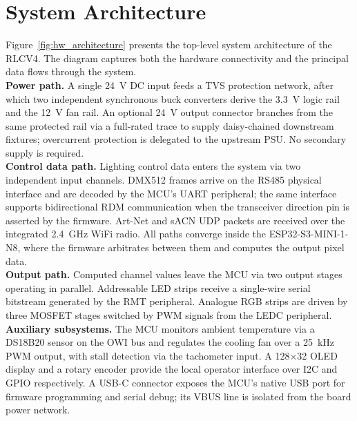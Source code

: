 \section{System Architecture}
\label{sec:system_architecture}

Figure~\ref{fig:hw_architecture} presents the top-level system architecture of the RLCV4.
The diagram captures both the hardware connectivity and the principal data flows through the system. \\

\textbf{Power path.}
A single \SI{24}{\volt} \ac{DC} input feeds a \ac{TVS} protection network, after which two independent synchronous buck converters derive the \SI{3.3}{\volt} logic rail and the \SI{12}{\volt} fan rail.
An optional \SI{24}{\volt} output connector branches from the same protected rail via a full-rated trace to supply daisy-chained downstream fixtures; overcurrent protection is delegated to the upstream \ac{PSU}.
No secondary supply is required. \\

\textbf{Control data path.}
Lighting control data enters the system via two independent input channels.
\ac{DMX}512 frames arrive on the \ac{RS485} physical interface and are decoded by the \ac{MCU}'s \ac{UART} peripheral; the same interface supports bidirectional \ac{RDM} communication when the transceiver direction pin is asserted by the firmware.
Art-Net and \ac{sACN} \ac{UDP} packets are received over the integrated \SI{2.4}{\giga\hertz} \ac{WiFi} radio.
All paths converge inside the ESP32-S3-MINI-1-N8, where the firmware arbitrates between them and computes the output pixel data.\\

\textbf{Output path.}
Computed channel values leave the \ac{MCU} via two output stages operating in parallel.
Addressable \ac{LED} strips receive a single-wire serial bitstream generated by the \ac{RMT} peripheral.
Analogue \ac{RGB} strips are driven by three \ac{MOSFET} stages switched by \ac{PWM} signals from the LEDC peripheral.\\

\textbf{Auxiliary subsystems.}
The \ac{MCU} monitors ambient temperature via a DS18B20 sensor on the \ac{OWI} bus and regulates the cooling fan over a \SI{25}{\kilo\hertz} \ac{PWM} output, with stall detection via the tachometer input.
A 128$\times$32 \ac{OLED} display and a rotary encoder provide the local operator interface over \ac{I2C} and \ac{GPIO} respectively.
A \ac{USB}-C connector exposes the \ac{MCU}'s native \ac{USB} port for firmware programming and serial debug; its VBUS line is isolated from the board power network.\\


